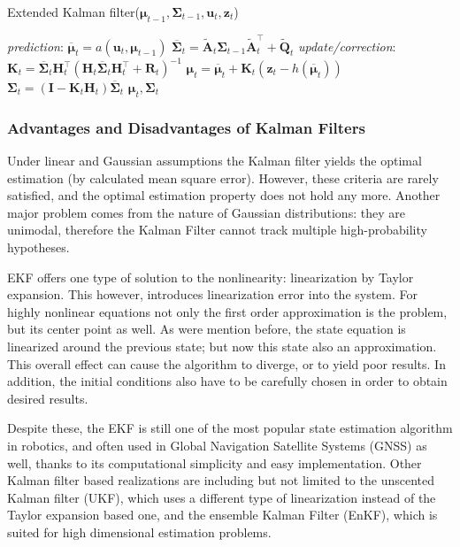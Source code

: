 \begin{algorithm}
    \caption{Extended Kalman filter($\boldsymbol{\mu}_{t-1},\mathbf{\Sigma}_{t-1},\mathbf{u}_t,\mathbf{z}_t$)}\label{alg:ekf}
    \begin{algorithmic}[1]
        \BState \emph{prediction}:
        \State\indent$\overline{\boldsymbol{\mu}}_t = a(\mathbf{u}_t,\boldsymbol{\mu}_{t-1})$
        \State\indent $\overline{\mathbf{\Sigma}}_t = \tilde{\mathbf{A}}_t\mathbf{\Sigma}_{t-1}\tilde{\mathbf{A}}^\top_t + \tilde{\mathbf{Q}}_t$
        \BState \emph{update/correction}:
        \State\indent $\mathbf{K}_t = \overline{\mathbf{\Sigma}}_t\mathbf{H}_t^\top\left(\mathbf{H}_t\overline{\mathbf{\Sigma}}_t\mathbf{H}_t^\top+\mathbf{R}_t\right)^{-1}$
        \State\indent $\boldsymbol{\mu}_t = \overline{\boldsymbol{\mu}}_t + \mathbf{K}_t\left(\mathbf{z}_t-h(\overline{\boldsymbol{\mu}}_t)\right)$
        \State\indent $\mathbf{\Sigma}_t = \left(\mathbf{I}-\mathbf{K}_t\mathbf{H}_t\right)\overline{\mathbf{\Sigma}}_t$
        \State\Return $\boldsymbol{\mu}_t,\mathbf{\Sigma}_t$
    \end{algorithmic}
\end{algorithm}
\subsubsection{Advantages and Disadvantages of Kalman Filters}

Under linear and Gaussian assumptions the Kalman filter yields the optimal estimation (by calculated mean square error). However, these criteria are rarely satisfied, and the optimal estimation property does not hold any more. Another major problem comes from the nature of Gaussian distributions: they are unimodal, therefore the Kalman Filter cannot track multiple high-probability hypotheses.

EKF offers one type of solution to the nonlinearity: linearization by Taylor expansion. This however, introduces linearization error into the system. For highly nonlinear equations not only the first order approximation is the problem, but its center point as well. As were mention before, the state equation is linearized around the previous state; but now this state also an approximation. This overall effect can cause the algorithm to diverge, or to yield poor results. In addition, the initial conditions also have to be carefully chosen in order to obtain desired results.

Despite these, the EKF is still one of the most popular state estimation algorithm in robotics, and often used in Global Navigation Satellite Systems (GNSS) as well, thanks to its computational simplicity and easy  implementation. Other Kalman filter based realizations are including but not limited to the unscented Kalman filter (UKF), which uses a different type of linearization instead of the Taylor expansion based one, and the ensemble Kalman Filter (EnKF), which is suited for high dimensional estimation problems.

